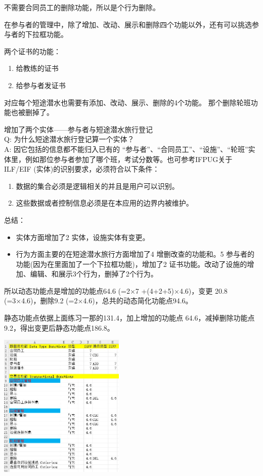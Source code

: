 不需要合同员工的删除功能，所以是个行为删除。

在参与者的管理中，除了增加、改动、展示和删除四个功能以外，还有可以挑选参与者的下拉框功能。

两个证书的功能：

\begin{enumerate}
\tightlist
\item
  给教练的证书
\item
  给参与者发证书
\end{enumerate}

对应每个短途潜水也需要有添加、改动、展示、删除的4个功能。
那个删除轮班功能也被删掉了。

增加了两个实体------参与者与短途潜水旅行登记\\
Q: 为什么短途潜水旅行登记算一个实体？\\
A: 因它包括的信息都不能归入已有的
``参与者''、``合同员工''、``设施''、``轮班''实体里，例如那位参与者参加了哪个班，考试分数等。也可参考IFPUG关于ILF/EIF
(实体)的识别要求，必须符合以下条件：

\begin{enumerate}
\tightlist
\item
  数据的集合必须是逻辑相关的并且是用户可以识别。
\item
  这些数据或者控制信息必须是在本应用的边界内被维护。
\end{enumerate}

总结：

\begin{itemize}
\tightlist
\item
  实体方面增加了2 实体，设施实体有变更。
\item
  行为方面主要的在短途潜水旅行方面增加了4 增删改查的功能和。5
  参与者的功能(因为在里面加了一个下拉框功能)，增加了2
  证书功能。改动了设施的增加、编辑、和展示3个行为，删掉了2个行为。
\end{itemize}

所以动态功能点是增加的功能点64.6 (=2×7 +(4+2+5)×4.6)，变更 20.8
(=3×4.6)，删除9.2 (=2×4.6)，总共的动态简化功能点94.6。

静态功能点依据上面练习一那的131.4，加上增加的功能点
64.6，减掉删除功能点9.2，得出变更后静态功能点186.8。


\includegraphics[width=6cm]{Ex2XlsScreenshot_2022-04-05_143941.jpg}

